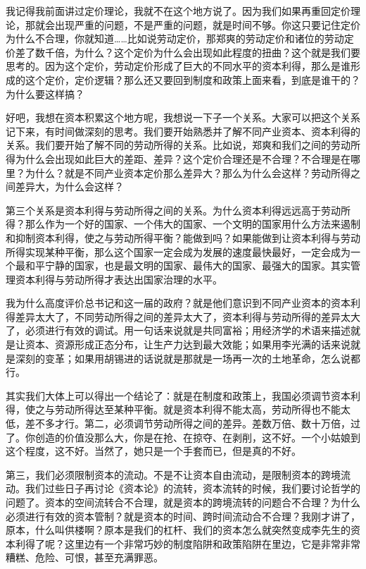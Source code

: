 \documentclass[UTF8, 12pt, a4paper]{ctexrep}
\begin{document}
我记得我前面讲过定价理论，我就不在这个地方说了。因为我们如果再重回定价理论，那就会出现严重的问题，不是严重的问题，就是时间不够。你这只要记住定价为什么不合理，你就知道……比如说劳动定价，那郑爽的劳动定价和诸位的劳动定价差了数千倍，为什么？这个定价为什么会出现如此程度的扭曲？这个就是我们要思考的。因为这个定价，劳动定价形成了巨大的不同水平的资本利得，那么是谁形成的这个定价，定价逻辑？那么还又要回到制度和政策上面来看，到底是谁干的？为什么要这样搞？

好吧，我想在资本积累这个地方呢，我想说一下子一个关系。大家可以把这个关系记下来，有时间做深刻的思考。我们要开始熟悉并了解不同产业资本、资本利得的关系。我们要开始了解不同的劳动所得的关系。比如说，郑爽和我们之间的劳动所得为什么会出现如此巨大的差距、差异？这个定价合理还是不合理？不合理是在哪里？为什么？就是不同产业资本定价那么差异大？那么为什么会这样？劳动所得之间差异大，为什么会这样？

第三个关系是资本利得与劳动所得之间的关系。为什么资本利得远远高于劳动所得？那么作为一个好的国家、一个伟大的国家、一个文明的国家用什么方法来遏制和抑制资本利得，使之与劳动所得平衡？能做到吗？如果能做到让资本利得与劳动所得实现某种平衡，那么这个国家一定会成为发展的速度最快最好，一定会成为一个最和平宁静的国家，也是最文明的国家、最伟大的国家、最强大的国家。其实管理资本利得与劳动所得才表达出国家治理的水平。

我为什么高度评价总书记和这一届的政府？就是他们意识到不同产业资本的资本利得差异太大了，不同劳动所得之间的差异太大了，资本利得与劳动所得的差异太大了，必须进行有效的调试。用一句话来说就是共同富裕；用经济学的术语来描述就是让资本、资源形成正态分布，让生产力达到最大效能；如果用李光满的话来说就是深刻的变革；如果用胡锡进的话说就是那就是一场再一次的土地革命，怎么说都行。

其实我们大体上可以得出一个结论了：就是在制度和政策上，我国必须调节资本利得，使之与劳动所得达至某种平衡。就是资本利得不能太高，劳动所得也不能太低，差不多才行。第二，必须调节劳动所得之间的差异。差数万倍、数十万倍，过了。你创造的价值没那么大，你是在抢、在掠夺、在剥削，这不好。一个小姑娘到这个程度，这不好。当然了，她只是一个手套而已，但是真的不好。

第三，我们必须限制资本的流动。不是不让资本自由流动，是限制资本的跨境流动。我们过些日子再讨论《资本论》的流转，资本流转的时候，我们要讨论哲学的问题了。资本的空间流转合不合理，就是资本的跨境流转的问题合不合理？为什么必须进行有效的资本管制？就是资本的时间、跨时间流动合不合理？我刚才讲了，原本，什么叫供楼啊？原本是我们的杠杆、我们的资本怎么就突然变成李先生的资本利得了呢？这里边有一个非常巧妙的制度陷阱和政策陷阱在里边，它是非常非常糟糕、危险、可恨，甚至充满罪恶。
\end{document}
